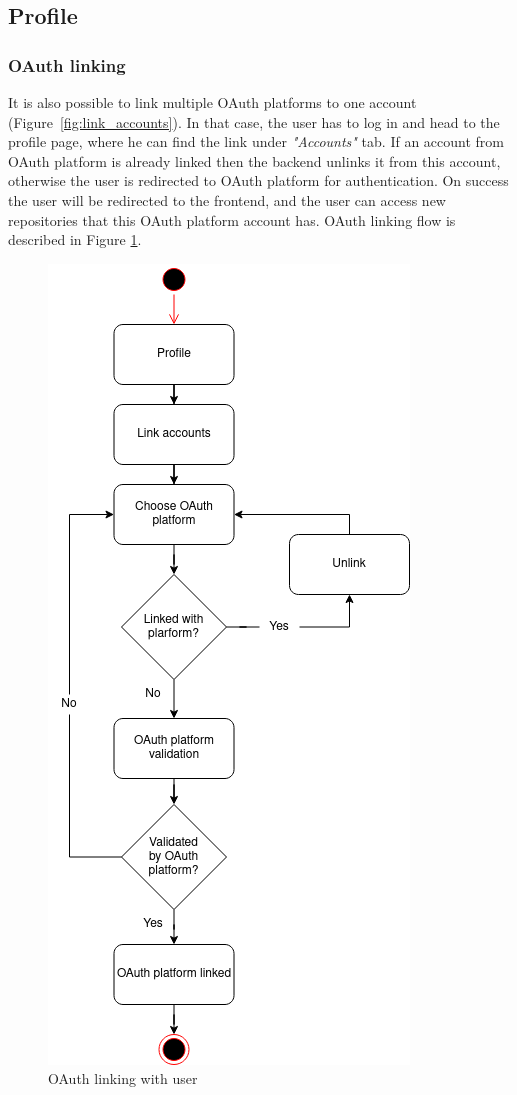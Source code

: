 \subsection{Profile}\label{subsec:profile}
\subsubsection{OAuth linking}\label{subsubsec:oauth-linking}
It is also possible to link multiple OAuth platforms to one account (Figure~\ref{fig:link_accounts}).
In that case, the user has to log in and head to the profile page, where he can find the link  under \textit{"Accounts"} tab.
If an account from OAuth platform is already linked then the backend unlinks it from this account, otherwise the user is redirected to OAuth platform for authentication.
On success the user will be redirected to the frontend, and the user can access new repositories that this OAuth platform account has.
OAuth linking flow is described in Figure
\ref{fig:account-linking}.

\begin{figure}[H]
    \centering
    \includegraphics[width=0.5\linewidth]{figures/oauth_linking_user_flow}
    \caption{OAuth linking with user}
    \label{fig:account-linking}
\end{figure}


